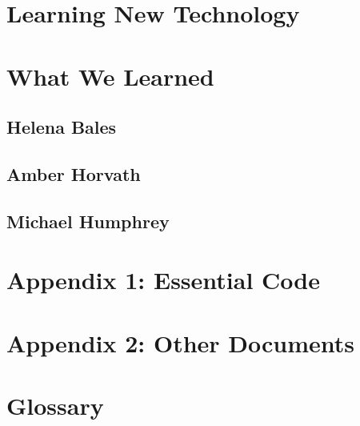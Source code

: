 \documentclass[letterpaper,10pt]{article}
\begin{document}
\section{Learning New Technology}


\section{What We Learned}
\subsection{Helena Bales}

\subsection{Amber Horvath}

\subsection{Michael Humphrey}


\section{Appendix 1: Essential Code}


\section{Appendix 2: Other Documents}


\section{Glossary}
\glsaddall
\printglossaries
\end{document}

